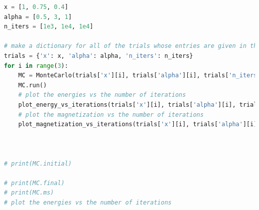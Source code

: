 \documentclass[12pt]{article}
\begin{document}
\begin{lstlisting}[language=Python]
x = [1, 0.75, 0.4]
alpha = [0.5, 3, 1]
n_iters = [1e3, 1e4, 1e4]

# make a dictionary for all of the trials whose entries are given in the correct order in the lists above
trials = {'x': x, 'alpha': alpha, 'n_iters': n_iters}
for i in range(3):
    MC = MonteCarlo(trials['x'][i], trials['alpha'][i], trials['n_iters'][i])
    MC.run()
    # plot the energies vs the number of iterations
    plot_energy_vs_iterations(trials['x'][i], trials['alpha'][i], trials['n_iters'][i])
    # plot the magnetization vs the number of iterations
    plot_magnetization_vs_iterations(trials['x'][i], trials['alpha'][i], trials['n_iters'][i])



# print(MC.initial)

# print(MC.final)
# print(MC.ms)
# plot the energies vs the number of iterations


\end{lstlisting}
\end{document}
